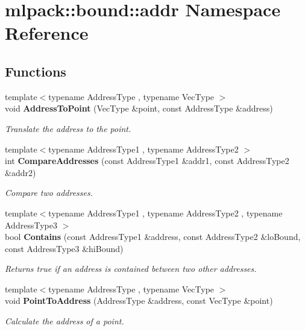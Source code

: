 \section{mlpack\+:\+:bound\+:\+:addr Namespace Reference}
\label{namespacemlpack_1_1bound_1_1addr}
\subsection*{Functions}
\begin{DoxyCompactItemize}
\item 
{\footnotesize template$<$typename Address\+Type , typename Vec\+Type $>$ }\\void {\bf Address\+To\+Point} (Vec\+Type \&point, const Address\+Type \&address)
\begin{DoxyCompactList}\small\item\em Translate the address to the point. \end{DoxyCompactList}\item 
{\footnotesize template$<$typename Address\+Type1 , typename Address\+Type2 $>$ }\\int {\bf Compare\+Addresses} (const Address\+Type1 \&addr1, const Address\+Type2 \&addr2)
\begin{DoxyCompactList}\small\item\em Compare two addresses. \end{DoxyCompactList}\item 
{\footnotesize template$<$typename Address\+Type1 , typename Address\+Type2 , typename Address\+Type3 $>$ }\\bool {\bf Contains} (const Address\+Type1 \&address, const Address\+Type2 \&lo\+Bound, const Address\+Type3 \&hi\+Bound)
\begin{DoxyCompactList}\small\item\em Returns true if an address is contained between two other addresses. \end{DoxyCompactList}\item 
{\footnotesize template$<$typename Address\+Type , typename Vec\+Type $>$ }\\void {\bf Point\+To\+Address} (Address\+Type \&address, const Vec\+Type \&point)
\begin{DoxyCompactList}\small\item\em Calculate the address of a point. \end{DoxyCompactList}\end{DoxyCompactItemize}


